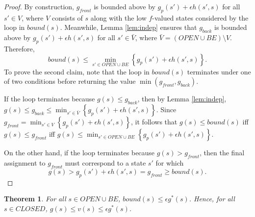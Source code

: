 \documentclass[letterpaper]{article}
\newtheorem{thm}{Theorem}
\begin{document}
\begin{proof}
By construction, $g_{front}$ is bounded above by $g_p(s') + \epsilon h(s',s)$ for all $s'\in V$, where $V$ consists of $s$ along with the low $f$-valued states considered by the loop in $bound(s)$. Meanwhile, Lemma \ref{lem:indep} ensures that $g_{back}$ is bounded above by $g_p(s') + \epsilon h(s',s)$ for all $s'\in \bar V$, where $\bar V = (OPEN \cup BE) \setminus V$. Therefore,
\[bound(s) \le \min_{s' \in OPEN \cup BE} \left\{g_p(s') + \epsilon h(s',s)\right\}.\]
To prove the second claim, note that the loop in $bound(s)$ terminates under one of two conditions before returning the value $\min(g_{front},g_{back})$.

If the loop terminates because $g(s) \le g_{back}$, then by Lemma \ref{lem:indep}, $g(s) \le g_{back} \le \min_{s'\in \bar V} \left\{ g_p(s') + \epsilon h(s',s) \right\}$. Since $g_{front} = \min_{s'\in V} \left\{ g_p(s') + \epsilon h(s',s) \right\}$, it follows that $g(s) \le bound(s)$ iff $g(s) \le g_{front}$ iff $g(s) \le \min_{s'\in OPEN \cup BE} \left\{ g_p(s') + \epsilon h(s',s) \right\}$.

On the other hand, if the loop terminates because $g(s) > g_{front}$, then the final assignment to $g_{front}$ must correspond to a state $s'$ for which
\[g(s) > g_p(s') + \epsilon h(s',s) = g_{front} \ge bound(s).\]
\end{proof}

\begin{thm}
\label{thm:subopt}
For all $s\in OPEN\cup BE$, $bound(s) \le \epsilon g^*(s)$. Hence, for all $s\in CLOSED$, $g(s) \le v(s) \le \epsilon g^*(s)$.
\end{thm}
\end{document}
